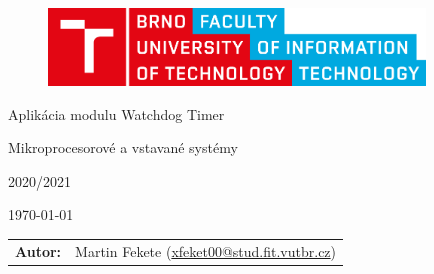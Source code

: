 \begin{titlepage}

\vspace*{2cm}
\begin{figure}[!h]
  \centering
  \includegraphics[width=10cm]{vut-fit-logo.pdf}
\end{figure}

\vfill

\begin{center}

\begin{Huge}
Aplikácia modulu Watchdog Timer
\end{Huge}

\bigskip

\begin{Large}
Mikroprocesorové a vstavané systémy
\end{Large}

\bigskip

\begin{Large}
	2020/2021
\end{Large}

\end{center}

\vfill

\begin{center}
\begin{Large}
\today
\end{Large}
\end{center}

\vfill

\begin{flushleft}
\begin{normalsize}
\begin{tabular}{ll}
\bf Autor:\hspace{1mm} & Martin Fekete (\url{xfeket00@stud.fit.vutbr.cz}) \\[3mm]
\end{tabular}
\end{normalsize}
\end{flushleft}
\end{titlepage}
